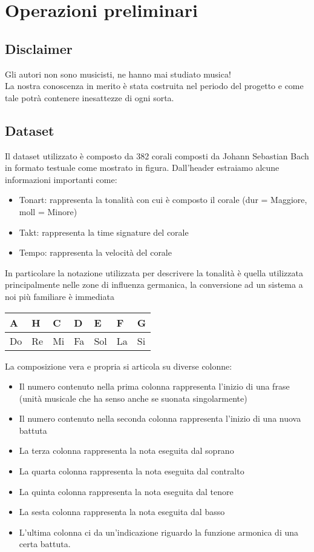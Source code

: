\chapter{Operazioni preliminari}\label{ch:th-music}

\section{Disclaimer}
Gli autori non sono musicisti, ne hanno mai studiato musica! \\
La nostra conoscenza in merito è stata costruita nel periodo del progetto e come tale potrà contenere inesattezze di ogni sorta.

\section{Dataset}
Il dataset utilizzato è composto da 382 corali composti da Johann Sebastian Bach in formato testuale come mostrato in figura.
Dall'header estraiamo alcune informazioni importanti come:
\begin{itemize}
\item Tonart: rappresenta la tonalità con cui è composto il corale (dur = Maggiore, moll = Minore)
\item Takt: rappresenta la time signature del corale
\item Tempo: rappresenta la velocità del corale
\end{itemize}
In particolare la notazione utilizzata per descrivere la tonalità è quella utilizzata principalmente nelle zone di influenza germanica, la conversione ad un sistema a noi più familiare è immediata
\begin{table}[H]
\begin{tabular}{|l|l|l|l|l|l|l|}
\hline
A  & H  & C  & D  & E   & F  & G  \\ \hline
Do & Re & Mi & Fa & Sol & La & Si \\ \hline
\end{tabular}
\end{table}
La composizione vera e propria si articola su diverse colonne:
\begin{itemize}
\item Il numero contenuto nella prima colonna rappresenta l'inizio di una frase (unità musicale che ha senso anche se suonata singolarmente)
\item Il numero contenuto nella seconda colonna rappresenta l'inizio di una nuova battuta
\item La terza colonna rappresenta la nota eseguita dal soprano
\item La quarta colonna rappresenta la nota eseguita dal contralto
\item La quinta colonna rappresenta la nota eseguita dal tenore
\item La sesta colonna rappresenta la nota eseguita dal basso
\item L'ultima colonna ci da un'indicazione riguardo la funzione armonica di una certa battuta.
\end{itemize}

